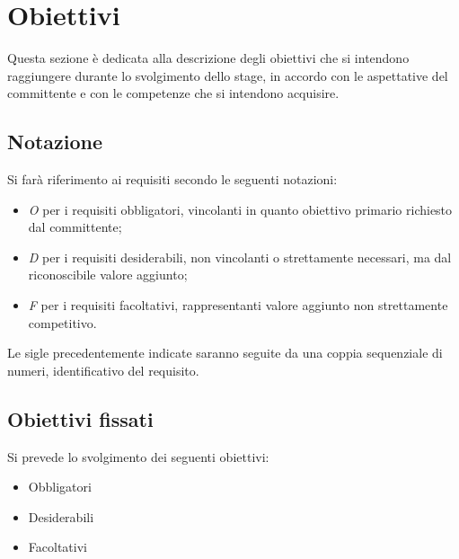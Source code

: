 \section*{Obiettivi}
Questa sezione è dedicata alla descrizione degli obiettivi che si intendono raggiungere durante lo svolgimento dello stage, in accordo con le aspettative del committente e con le competenze che si intendono acquisire.

\subsection*{Notazione}
Si farà riferimento ai requisiti secondo le seguenti notazioni:
\begin{itemize}
	\item \textit{O} per i requisiti obbligatori, vincolanti in quanto obiettivo primario richiesto dal committente;
	\item \textit{D} per i requisiti desiderabili, non vincolanti o strettamente necessari,
		  ma dal riconoscibile valore aggiunto;
	\item \textit{F} per i requisiti facoltativi, rappresentanti valore aggiunto non strettamente 
		  competitivo.
\end{itemize}

Le sigle precedentemente indicate saranno seguite da una coppia sequenziale di numeri, identificativo del requisito.

\subsection*{Obiettivi fissati}
Si prevede lo svolgimento dei seguenti obiettivi:
\begin{itemize}
	\item Obbligatori
	\begin{itemize}
		\obiettiviObbligatori
	\end{itemize}
	
	\item Desiderabili 
	\begin{itemize}
		\obiettiviDesiderabili
	\end{itemize}
	
	\item Facoltativi
	\begin{itemize}
		\obiettiviFacoltativi
	\end{itemize} 
\end{itemize}

\newpage